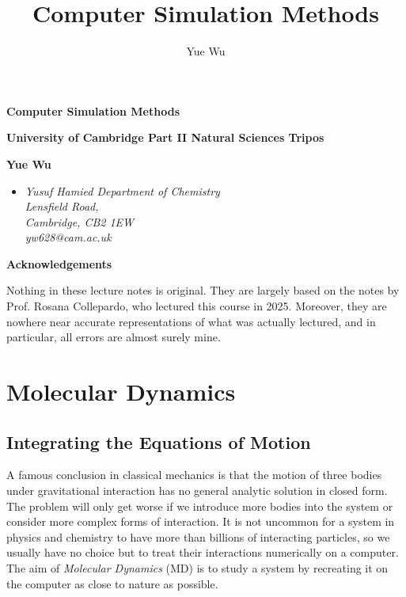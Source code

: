 \documentclass{article}
\title{Computer Simulation Methods}
\author{Yue Wu}
\theoremstyle{plain}\theoremheaderfont{\normalfont\itshape}\theorembodyfont{\rmfamily}\theoremseparator{.}\newtheorem*{rem}{Remark}\newtheorem*{ex}{Example}\newtheorem*{proof}{Proof}\newtheorem*{altp}{Alternative proof}
\theoremstyle{plain}\theoremheaderfont{\normalfont\bfseries}\theorembodyfont{\rmfamily}\theoremseparator{.}\newtheorem{thm}{Theorem}[section]\newtheorem{lem}[thm]{Lemma}\newtheorem{prop}[thm]{Proposition}\newtheorem*{cor}{Corollary}\newtheorem{defn}[thm]{Definition}\newtheorem{clm}[thm]{Claim}\newtheorem{clminproof}{Claim}\newtheorem{alg}[thm]{Algorithm}\newtheorem{hyp}[thm]{Hypothesis}\newtheorem{law}[thm]{Law}
\theoremstyle{break}\theoremheaderfont{\normalfont\itshape}\theorembodyfont{\rmfamily}\theoremseparator{.\medskip}\newtheorem*{proofskip}{Proof}\newtheorem*{exs}{Examples}\newtheorem*{rems}{Remarks}
\theoremstyle{break}\theoremheaderfont{\normalfont\bfseries}\theorembodyfont{\rmfamily}\theoremseparator{.\medskip}\newtheorem{lemskip}[thm]{Lemma}\newtheorem{defnskip}[thm]{Definition}\newtheorem{propskip}[thm]{Proposition}\newtheorem{thmskip}[thm]{Theorem}
\numberwithin{equation}{section}
\begin{document}
    \setlength{\parindent}{0pt}
	\Huge\textsf{\textbf{Computer Simulation Methods}}
		
	\Large\textsf{\textbf{University of Cambridge Part II Natural Sciences Tripos}}

	\noindent\makebox[\linewidth]{\rule{\textwidth}{2pt}}

	\large\textsf{\textbf{Yue Wu}}
	\begin{itemize}[topsep=0pt,leftmargin=15pt]
		\item[] \textit{Yusuf Hamied Department of Chemistry\\
		Lensfield Road,\\
		Cambridge, CB2 1EW}\\

		\textit{yw628@cam.ac.uk}
	\end{itemize}
    \thispagestyle{empty}
    \setlength{\parindent}{15pt}

    \newpage
    \begin{center}
		\textbf{\Large{Acknowledgements}}
	\end{center}
	\large
	Nothing in these lecture notes is original. They are largely based on the notes by Prof. Rosana Collepardo, who lectured this course in 2025. Moreover, they are nowhere near accurate representations of what was actually lectured, and in particular, all errors are almost surely mine.

	\normalsize
	\newpage
	\tableofcontents
	\newpage
    
    \section{Molecular Dynamics}
    \subsection{Integrating the Equations of Motion}
    A famous conclusion in classical mechanics is that the motion of three bodies under gravitational interaction has no general analytic solution in closed form. The problem will only get worse if we introduce more bodies into the system or consider more complex forms of interaction. It is not uncommon for a system in physics and chemistry to have more than billions of interacting particles, so we usually have no choice but to treat their interactions numerically on a computer. The aim of \textit{Molecular Dynamics} (MD) is to study a system by recreating it on the computer as close to nature as possible.
\end{document}
